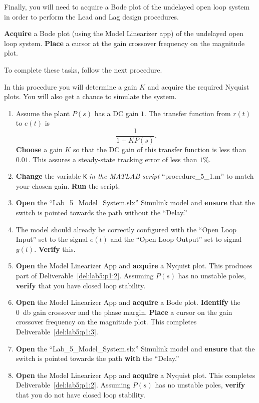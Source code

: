 %
Finally, you will need to acquire a Bode plot of the undelayed open loop system in order to perform the Lead and Lag design procedures.
%
\begin{deliverable}[label={del:lab5:p1:3}]
  \textbf{Acquire} a Bode plot (using the Model Linearizer app) of the undelayed open loop system.
  \textbf{Place} a cursor at the gain crossover frequency on the magnitude plot.
\end{deliverable}
%
To complete these tasks, follow the next procedure.
%
\begin{procedure}[label={proc:lab5:1}]
  In this procedure you will determine a gain \(K\) and acquire the required Nyquist plots.
  You will also get a chance to simulate the system.
  \begin{enumerate}[label={(\arabic*)}]
    \item{%
      Assume the plant \(P(s)\) has a DC gain \(1.\)
      The transfer function from \(r(t)\) to \(e(t)\) is
      \[
        \frac{1}{1 + K P(s)}.
      \]
      \textbf{Choose} a gain \(K\) so that the DC gain of this transfer function is less than \(0.01.\)
      This assures a steady-state tracking error of less than \(1\%.\)
    }
    \item{%
      \textbf{Change} the variable \texttt{K} \emph{in the MATLAB script} ``procedure\_5\_1.m'' to match your chosen gain.
      \textbf{Run} the script.
    }
    \item{%
      \textbf{Open} the ``Lab\_5\_Model\_System.slx'' Simulink model and \textbf{ensure} that the switch is pointed towards the path without the ``Delay.''
    }
    \item{%
      The model should already be correctly configured with the ``Open Loop Input'' set to the signal \(e(t)\) and the ``Open Loop Output'' set to signal \(y(t).\)
      \textbf{Verify} this.
    }
    \item{%
      \textbf{Open} the Model Linearizer App and \textbf{acquire} a Nyquist plot.
      This produces part of Deliverable~\ref{del:lab5:p1:2}.
      Assuming \(P(s)\) has no unstable poles, \textbf{verify} that you have closed loop stability.
    }
    \item{%
      \textbf{Open} the Model Linearizer App and \textbf{acquire} a Bode plot.
      \textbf{Identify} the \SI{0}{\decibel} gain crossover and the phase margin.
      \textbf{Place} a cursor on the gain crossover frequency on the magnitude plot.
      This completes Deliverable~\ref{del:lab5:p1:3}.
    }
    \item{%
      \textbf{Open} the ``Lab\_5\_Model\_System.slx'' Simulink model and \textbf{ensure} that the switch is pointed towards the path \textbf{with} the ``Delay.''
    }
    \item{%
      \textbf{Open} the Model Linearizer App and \textbf{acquire} a Nyquist plot.
      This completes Deliverable~\ref{del:lab5:p1:2}.
      Assuming \(P(s)\) has no unstable poles, \textbf{verify} that you do not have closed loop stability.
    }
  \end{enumerate}
\end{procedure}

